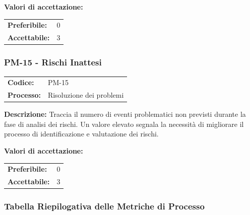 \documentclass[a4paper,11pt,oneside]{scrartcl}
\begin{document}
\vspace{0.2cm}
\noindent\textbf{Valori di accettazione:}
\vspace{0.1cm}

\noindent
\begin{tabular}{@{}ll@{}}
\textbf{Preferibile:} & $0$ \\
\textbf{Accettabile:} & $3$ \\
\end{tabular}

\subsubsection{PM-15 - Rischi Inattesi}

\noindent
\begin{tabular}{@{}p{}p{}@{}}
\textbf{Codice:} & PM-15 \\
\textbf{Processo:} & Risoluzione dei problemi \\
\end{tabular}

\vspace{0.3cm}
\noindent\textbf{Descrizione:} Traccia il numero di eventi problematici non previsti durante la fase di analisi dei rischi. Un valore elevato segnala la necessità di migliorare il processo di identificazione e valutazione dei rischi.

\vspace{0.2cm}
\noindent\textbf{Valori di accettazione:}
\vspace{0.1cm}

\noindent
\begin{tabular}{@{}ll@{}}
\textbf{Preferibile:} & $0$ \\
\textbf{Accettabile:} & $3$ \\
\end{tabular}

\subsubsection{Tabella Riepilogativa delle Metriche di Processo}
\end{document}
